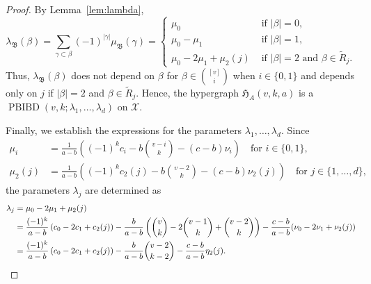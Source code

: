 \documentclass[10pt,a4paper]{amsart}
\begin{document}
\begin{proof}
By Lemma~\ref{lem:lambda},
$$
\lambda_\mathfrak B(\beta)=\sum_{\gamma\subset \beta}(-1)^{|\gamma|}\mu_\mathfrak B(\gamma)=\begin{cases}\mu_0 & \text{ if }|\beta|=0,\\
\mu_0-\mu_1 & \text{ if }|\beta|=1,\\
\mu_0-2\mu_1+\mu_{2}(j) & \text{ if }|\beta|=2\text{ and }\beta\in \tilde{R}_j.
\end{cases} 
$$
Thus, $\lambda_\mathfrak B(\beta)$ does not depend on $\beta$ for $\beta \in \binom{[v]}{i}$ when $i\in\{0,1\}$ and depends only on $j$  if $|\beta|=2$ and $\beta\in \tilde{R}_j$.  
Hence, the hypergraph $\mathfrak H_{A}(v,k,a)$ 
is a $\operatorname{PBIBD}(v,k;\lambda_1,\ldots,\lambda_d)$ on $\mathcal{X}$.

Finally, we establish the expressions for the parameters $\lambda_1,\ldots,\lambda_d$.  
Since 
\begin{align*}
\mu_i&=\frac{1}{a-b}\left((-1)^{k} c_{i}-b\binom{v-i}{k}-(c-b)\nu_{i}\right)\quad\text{for $i\in \{0,1\}$},\\  
\mu_{2}(j)&=\frac{1}{a-b}\left((-1)^{k} c_{2}(j)-b\binom{v-2}{k}-(c-b)\nu_{2}(j)\right)\quad\text{for $j\in \{1,\dots,d\}$},   
\end{align*}
the parameters $\lambda_j$ are determined as 
\begin{align*}
\lambda_j&=\mu_0-2\mu_1+\mu_{2}(j)\\
    &=\frac{(-1)^k}{a-b}\left(c_0-2c_1+c_{2}(j)\right)-\frac{b}{a-b}\left( \binom{v}{k} - 2\binom{v-1}{k}+\binom{v-2}{k}\right)-\frac{c-b}{a-b}(\nu_{0}-2\nu_1+\nu_2(j))\\
    &=\frac{(-1)^k}{a-b}\left(c_0-2c_1+c_{2}(j)\right)-\frac{b}{a-b}\binom{v-2}{k-2}-\frac{c-b}{a-b}\eta_2(j).\qedhere
\end{align*}
\end{proof}
\end{document}

